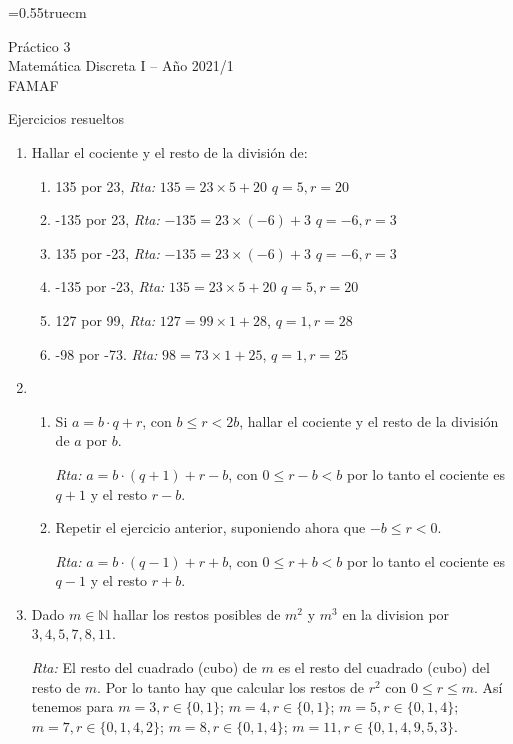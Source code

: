 \documentclass[a4paper,12pt,twoside,spanish,reqno]{amsbook}
\numberwithin{equation}{section}
\newcommand{\rta}{\noindent\textit{Rta: }}
\begin{document}
    \baselineskip=0.55truecm %
    
    
{\bf \begin{center} Práctico 3 \\ Matemática Discreta I -- Año 2021/1 \\ FAMAF \end{center}}

{\bf \begin{center} Ejercicios resueltos \end{center}}


\begin{enumerate}

\item Hallar el cociente y el resto de la divisi\'on de:
\begin{enumerate}
\item 
135 por 23, \rta $135= 23\times 5 +20$ $q=5, r=20$
\item
-135 por 23, \rta $-135= 23\times (-6) +3$ $q=-6, r=3$
\item
135 por -23, \rta $ -135= 23\times (-6) +3$ $q=-6, r=3$
\item
-135 por -23, \rta $135= 23\times 5 +20$ $q=5, r=20$
\item
127 por 99, \rta $127=99\times1+28$, $q=1, r=28$
\item
-98 por -73. \rta $ 98=73\times 1+25$, $q=1, r=25$
\end{enumerate}


\item 
\begin{enumerate}
    \item Si $a=b\cdot q+r$, con $b \le r <2 b$, hallar el cociente y el resto de la divisi\'on de $a$ por $b$.
    
    \rta $a = b \cdot (q+1) + r-b$, con $0 \le r-b < b$ por lo tanto el cociente es $q+1$ y el resto  $r-b$.
    
    
    \item Repetir el ejercicio anterior, suponiendo ahora que $-b \le r < 0$.  
    
    \rta  $a = b \cdot (q-1) + r+b$, con $0 \le r+b < b$ por lo tanto el cociente es $q-1$ y el resto  $r+b$.
\end{enumerate}



\item Dado $m\in \mathbb N$ hallar los restos posibles de $m^2$ y $m^3$ en la division por $3,4,5,7,8, 11$.


\rta El resto del cuadrado (cubo)  de $m$ es el resto del cuadrado (cubo)  del resto de $m$.
Por lo tanto hay que calcular los restos de $r^2$ con $0\le r\le m$.
Así tenemos para $m=3, r\in\{0, 1\}$; $m=4, r\in\{0,1\}$; $m=5, r\in\{0,1,4\}$; $m=7,r\in\{0,1,4,2\}$;
$m=8, r\in\{0,1,4\}$; $m=11, r\in\{0,1,4,9,5,3\}$.




\end{enumerate}
\end{document}
